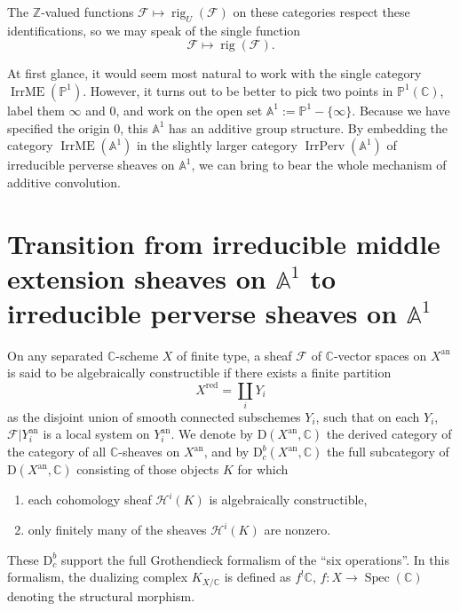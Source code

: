 The \(\mathbb{Z}\)-valued functions
\(\mathcal{F}\mapsto\operatorname{rig}_U(\mathcal{F})\) on these categories
respect these identifications, so we may speak of the single function
\[
  \mathcal{F}\mapsto\operatorname{rig}(\mathcal{F}).
\]

At first glance, it would seem most natural to work with the single category
\(\operatorname{IrrME}(\mathbb{P}^1)\). However, it turns out to be better to
pick two points in \(\mathbb{P}^1(\mathbb{C})\), label them \(\infty\) and
\(0\), and work on the open set
\(\mathbb{A}^1:=\mathbb{P}^1-\{\infty\}\). Because we have specified the
origin \(0\), this \(\mathbb{A}^1\) has an additive group structure. By
embedding the category \(\operatorname{IrrME}(\mathbb{A}^1)\) in the slightly
larger category \(\operatorname{IrrPerv}(\mathbb{A}^1)\) of irreducible
perverse sheaves on \(\mathbb{A}^1\), we can bring to bear the whole mechanism
of additive convolution.

\section[Transition from middle extensions to perverse sheaves on
\texorpdfstring{\(\mathbb{A}^1\)}{A1}]{Transition from irreducible middle
extension sheaves on
\texorpdfstring{\(\mathbb{A}^1\)}{A1} to irreducible perverse sheaves on
\texorpdfstring{\(\mathbb{A}^1\)}{A1}}
\label{sec:2.1}

On any separated \(\mathbb{C}\)-scheme \(X\) of finite type, a sheaf
\(\mathcal{F}\) of \(\mathbb{C}\)-vector spaces on \(X^{\mathrm{an}}\) is said
to be algebraically constructible if there exists a finite partition
\[
  X^{\mathrm{red}}=\coprod_i Y_i
\]
as the disjoint union of smooth connected subschemes \(Y_i\), such that on each
\(Y_i\), \(\mathcal{F}|Y_i^{\mathrm{an}}\) is a local system on
\(Y_i^{\mathrm{an}}\). We denote by
\(\mathrm{D}(X^{\mathrm{an}},\mathbb{C})\) the derived category of the category
of all \(\mathbb{C}\)-sheaves on \(X^{\mathrm{an}}\), and by
\(\mathrm{D}^b_c(X^{\mathrm{an}},\mathbb{C})\) the full subcategory of
\(\mathrm{D}(X^{\mathrm{an}},\mathbb{C})\) consisting of those objects \(K\)
for which
\begin{enumerate}[label=(\alph*)]
\item each cohomology sheaf \(\mathcal{H}^i(K)\) is algebraically
constructible,
\item only finitely many of the sheaves \(\mathcal{H}^i(K)\) are nonzero.
\end{enumerate}
These \(\mathrm{D}^b_c\) support the full Grothendieck formalism of the ``six
operations''. In this formalism, the dualizing complex \(K_{X/\mathbb{C}}\) is
defined as \(f^!\mathbb{C}\), \(f:X\to\operatorname{Spec}(\mathbb{C})\)
denoting the structural morphism.

